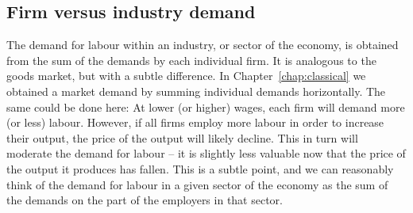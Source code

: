 \subsection*{Firm versus industry demand}

The demand for labour within an industry, or sector of the economy, is
obtained from the sum of the demands by each individual firm. It is
analogous to the goods market, but with a subtle difference. In Chapter~\ref{chap:classical} 
we obtained a market demand by summing individual demands horizontally. The same
could be done here: At lower (or higher) wages, each firm will demand
more (or less) labour. However, if all firms employ more labour in order to
increase their output, the price of the output will likely decline. This in
turn will moderate the demand for labour -- it is slightly less valuable now
that the price of the output it produces has fallen. This is a subtle point,
and we can reasonably think of the demand for labour in a given sector of
the economy as the sum of the demands on the part of the employers in that
sector.

